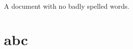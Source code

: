 \documentclass{report}
\begin{document}
A document with no badly spelled words.


\chapter{abc}\label{chap:1}
\end{document}
